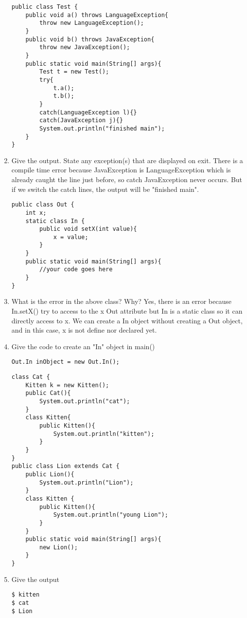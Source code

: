 \documentclass{article}
\begin{document}
\begin{enumerate}
\begin{lstlisting}
public class Test {
 	public void a() throws LanguageException{
  		throw new LanguageException();
 	}
 	public void b() throws JavaException{
  		throw new JavaException();
 	}
 	public static void main(String[] args){
  		Test t = new Test(); 
  		try{
   			t.a();
   			t.b();
  		}
  		catch(LanguageException l){}
  		catch(JavaException j){}
  		System.out.println("finished main");
 	}
}
\end{lstlisting}
	\item Give the output. State any exception(s) that are displayed on exit.\newline
	There is a compile time error because JavaException is LanguageException which is already caught the line just before, so catch JavaException never occurs.\newline
	But if we switch the catch lines, the output will be "finished main".
\begin{lstlisting}
public class Out {
 	int x;
 	static class In {
  		public void setX(int value){
   			x = value;
  		}
 	}
 	public static void main(String[] args){
  		//your code goes here
 	}
}
\end{lstlisting}
	\item What is the error in the above class? Why? \newline
	Yes, there is an error because In.setX() try to access to the x Out attribute but In is a static class so it can directly access to x. We can create a In object without creating a Out object, and in this case, x is not define nor declared yet.
	\item Give the code to create an "In" object in main()
\begin{lstlisting}
Out.In inObject = new Out.In();
\end{lstlisting}
	\newpage
\begin{lstlisting}
class Cat {
 	Kitten k = new Kitten();
 	public Cat(){
  		System.out.println("cat");
 	}
 	class Kitten{
  		public Kitten(){
   			System.out.println("kitten");
  		}
 	}
}
public class Lion extends Cat {
 	public Lion(){
  		System.out.println("Lion");
 	}
 	class Kitten {
  		public Kitten(){
   			System.out.println("young Lion");
  		}
 	}
 	public static void main(String[] args){
  		new Lion();
 	}
}
\end{lstlisting}
	\item Give the output
\begin{lstlisting}
$ kitten
$ cat
$ Lion
\end{lstlisting}
\begin{lstlisting}

\end{lstlisting}
\end{enumerate}
\end{document}
